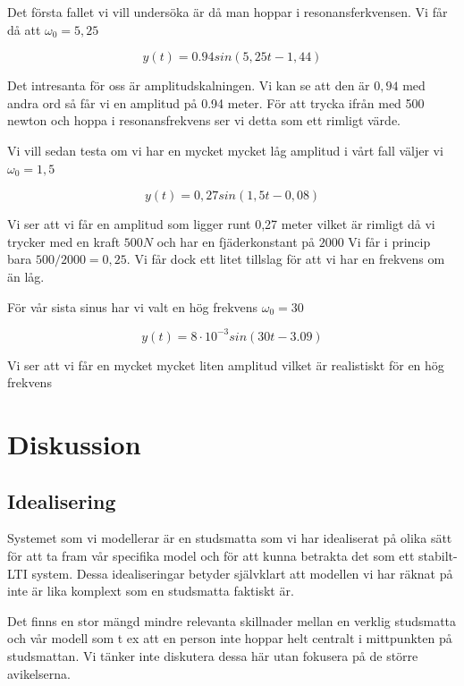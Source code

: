 \documentclass[10pt,a4paper]{article}
\begin{document}
Det första fallet vi vill undersöka är då man hoppar i resonansferkvensen. Vi får då att $\omega_0 = 5,25$

\begin{equation}
y(t) = 0.94 sin(5,25 t - 1,44)
\end{equation}

Det intresanta för oss är amplitudskalningen. Vi kan se att den är $0,94$ med andra ord så får vi en amplitud på 0.94 meter. För att trycka ifrån med 500 newton och hoppa i resonansfrekvens ser vi detta som ett rimligt värde.

Vi vill sedan testa om vi har en mycket mycket låg amplitud i vårt fall väljer vi $\omega_0 = 1,5$

\begin{equation}
y(t) = 0,27 sin(1,5 t - 0,08)
\end{equation}

Vi ser att vi får en amplitud som ligger runt 0,27 meter vilket är rimligt då vi trycker med en kraft $500N$ och har en fjäderkonstant på $2000$ Vi får i princip bara $500/2000 = 0,25$. Vi får dock ett litet tillslag för att vi har en frekvens om än låg.

För vår sista sinus har vi valt en hög frekvens $\omega_0 = 30$

\begin{equation}
y(t) = 8\cdot 10^{-3} sin(30 t - 3.09)
\end{equation}

Vi ser att vi får en mycket mycket liten amplitud vilket är realistiskt för en hög frekvens

\section{Diskussion}

\subsection{Idealisering}
Systemet som vi modellerar är en studsmatta som vi har idealiserat på olika sätt för att ta fram vår specifika model och för att kunna betrakta det som ett stabilt-LTI system. Dessa idealiseringar betyder självklart att modellen vi har räknat på inte är lika komplext som en studsmatta faktiskt är. 

Det finns en stor mängd mindre relevanta skillnader mellan en verklig studsmatta och vår modell som t ex att en person inte hoppar helt centralt i mittpunkten på studsmattan. Vi tänker inte diskutera dessa här utan fokusera på de större avikelserna.
\end{document}
